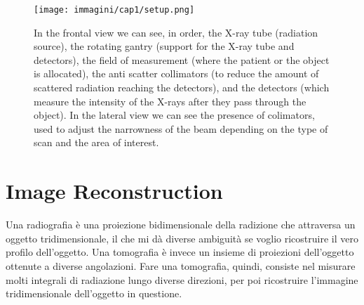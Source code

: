 \begin{figure}[h!]
    \centering
    \texttt{[image: immagini/cap1/setup.png]} 
    \caption{In the frontal view we can see, in order, the X-ray tube (radiation source), the rotating gantry (support for the X-ray tube and detectors), the field of measurement (where the patient or the object is allocated), the anti scatter collimators (to reduce the amount of scattered radiation reaching the detectors), and the detectors (which measure the intensity of the X-rays after they pass through the object). In the lateral view we can see the presence of colimators, used to adjust the narrowness of the beam depending on the type of scan and the area of interest.} 
    \label{fig:CT_detector}
\end{figure}

\section{Image Reconstruction}
Una radiografia è una proiezione bidimensionale della radizione che attraversa un oggetto tridimensionale, il che mi dà diverse ambiguità se voglio ricostruire il vero profilo dell'oggetto.
Una tomografia è invece un insieme di proiezioni dell'oggetto ottenute a diverse angolazioni.
Fare una tomografia, quindi, consiste nel misurare molti integrali di radiazione lungo diverse direzioni, per poi ricostruire l'immagine tridimensionale dell'oggetto in questione.

